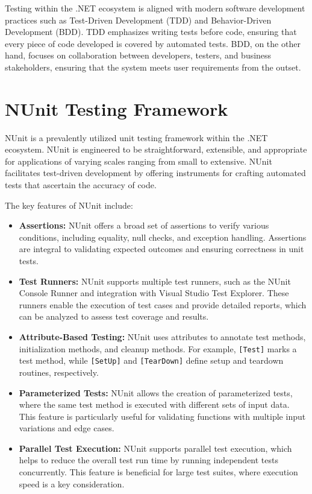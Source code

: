 Testing within the .NET ecosystem is aligned with modern software development practices such as Test-Driven Development (TDD) and Behavior-Driven Development (BDD). TDD emphasizes writing tests before code, ensuring that every piece of code developed is covered by automated tests. BDD, on the other hand, focuses on collaboration between developers, testers, and business stakeholders, ensuring that the system meets user requirements from the outset.

\section{NUnit Testing Framework}

NUnit is a prevalently utilized unit testing framework within the .NET ecosystem. NUnit is engineered to be straightforward, extensible, and appropriate for applications of varying scales ranging from small to extensive. NUnit facilitates test-driven development by offering instruments for crafting automated tests that ascertain the accuracy of code.

The key features of NUnit include:

\begin{itemize}
    \item \textbf{Assertions:} NUnit offers a broad set of assertions to verify various conditions, including equality, null checks, and exception handling. Assertions are integral to validating expected outcomes and ensuring correctness in unit tests.
    \item \textbf{Test Runners:} NUnit supports multiple test runners, such as the NUnit Console Runner and integration with Visual Studio Test Explorer. These runners enable the execution of test cases and provide detailed reports, which can be analyzed to assess test coverage and results.
    \item \textbf{Attribute-Based Testing:} NUnit uses attributes to annotate test methods, initialization methods, and cleanup methods. For example, \texttt{[Test]} marks a test method, while \texttt{[SetUp]} and \texttt{[TearDown]} define setup and teardown routines, respectively.
    \item \textbf{Parameterized Tests:} NUnit allows the creation of parameterized tests, where the same test method is executed with different sets of input data. This feature is particularly useful for validating functions with multiple input variations and edge cases.
    \item \textbf{Parallel Test Execution:} NUnit supports parallel test execution, which helps to reduce the overall test run time by running independent tests concurrently. This feature is beneficial for large test suites, where execution speed is a key consideration.
\end{itemize}

